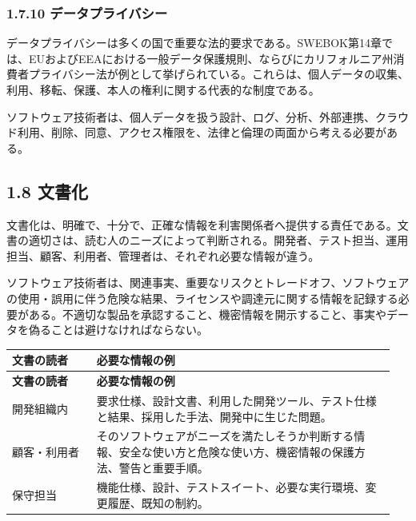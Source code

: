 \documentclass[uplatex,dvipdfmx,a4paper,11pt]{jsarticle}
\begin{document}
\subsubsection*{1.7.10 データプライバシー}


データプライバシーは多くの国で重要な法的要求である。SWEBOK第14章では、EUおよびEEAにおける一般データ保護規則、ならびにカリフォルニア州消費者プライバシー法が例として挙げられている。これらは、個人データの収集、利用、移転、保護、本人の権利に関する代表的な制度である。

ソフトウェア技術者は、個人データを扱う設計、ログ、分析、外部連携、クラウド利用、削除、同意、アクセス権限を、法律と倫理の両面から考える必要がある。

\subsection*{1.8 文書化}


文書化は、明確で、十分で、正確な情報を利害関係者へ提供する責任である。文書の適切さは、読む人のニーズによって判断される。開発者、テスト担当、運用担当、顧客、利用者、管理者は、それぞれ必要な情報が違う。

ソフトウェア技術者は、関連事実、重要なリスクとトレードオフ、ソフトウェアの使用・誤用に伴う危険な結果、ライセンスや調達元に関する情報を記録する必要がある。不適切な製品を承認すること、機密情報を開示すること、事実やデータを偽ることは避けなければならない。

\begin{center}
\small
\begin{longtable}{p{0.21\linewidth}p{0.74\linewidth}}
\toprule
\textbf{文書の読者} & \textbf{必要な情報の例} \\
\midrule
\endfirsthead
\toprule
\textbf{文書の読者} & \textbf{必要な情報の例} \\
\midrule
\endhead
開発組織内 & 要求仕様、設計文書、利用した開発ツール、テスト仕様と結果、採用した手法、開発中に生じた問題。 \\
\midrule
顧客・利用者 & そのソフトウェアがニーズを満たしそうか判断する情報、安全な使い方と危険な使い方、機密情報の保護方法、警告と重要手順。 \\
\midrule
保守担当 & 機能仕様、設計、テストスイート、必要な実行環境、変更履歴、既知の制約。 \\
\midrule
\bottomrule
\end{longtable}
\normalsize
\end{center}
\end{document}

